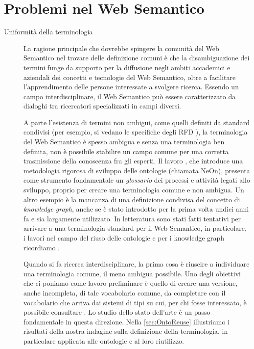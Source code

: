 \section{Problemi nel Web Semantico}
\label{sec:consolidamentoTerminologia}
\begin{description}
	\item[Uniformità della terminologia] La ragione principale che dovrebbe spingere la comunità del Web Semantico nel trovare delle definizione comuni è che la disambiguazione dei termini funge da supporto per la diffusione negli ambiti accademici e aziendali dei concetti e tecnologie del Web Semantico, oltre a facilitare l'apprendimento delle persone interessate a svolgere ricerca. Essendo un campo interdisciplinare, il Web Semantico può essere caratterizzato da dialoghi tra ricercatori specializzati in campi diversi.
	
	A parte l'esistenza di termini non ambigui, come quelli definiti da standard condivisi (per esempio, si vedano le specifiche degli RFD \cite{RDFspecification}), la terminologia del Web Semantico è spesso ambigua e senza una terminologia ben definita, non è possibile stabilire un campo comune per una corretta trasmissione della conoscenza fra gli esperti. Il lavoro \cite{NeOn}, che introduce una metodologia rigorosa di sviluppo delle ontologie (chiamata NeOn), presenta come strumento fondamentale un \emph{glossario} dei processi e attività legati allo sviluppo, proprio per creare una terminologia comune e non ambigua.  Un altro esempio è la mancanza di una definizione condivisa del concetto di \textit{knowledge graph}, anche se è stato introdotto per la prima volta undici anni fa e sia largamente utilizzato. In letteratura sono stati fatti tentativi per arrivare a una terminologia standard per il Web Semantico, in particolare, i lavori \cite{katsumi2018ontology, goy2015ontologies, NeOn} nel campo del riuso delle ontologie e per i knowledge graph ricordiamo \cite{ehrlinger2016towards}. 
	
	Quando si fa ricerca interdisciplinare, la prima cosa è riuscire a individuare una terminologia comune, il meno ambigua possibile. Uno degli obiettivi che ci poniamo come lavoro preliminare è quello di creare una versione, anche incompleta, di tale vocabolario comune, da completare con il vocabolario che arriva dai sistemi di tipi su cui, per chi fosse interessato, è possibile consultare \cite{pierceTypesBook}. Lo studio dello stato dell'arte è un passo fondamentale in questa direzione. Nella \autoref{sec:OntoReuse} illustriamo i risultati della nostra indagine sulla definizione della terminologia, in particolare applicata alle ontologie e al loro riutilizzo.
	

\end{description}
